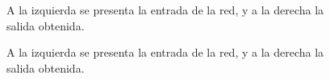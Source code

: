 \documentclass{article}
\begin{document}
\begin{center}
\begin{figure}[h!]
 \caption{A la izquierda se presenta la entrada de la red, y a la derecha la salida obtenida.}
 \label{Fig:inverts}
\end{figure}

\begin{figure}[h!]
 \centering
 

 \caption{A la izquierda se presenta la entrada de la red, y a la derecha la salida obtenida.}
 \label{Fig:mix}
\end{figure}

\begin{figure}[h!]
 \centering
 

\end{figure}
\end{center}
\end{document}
